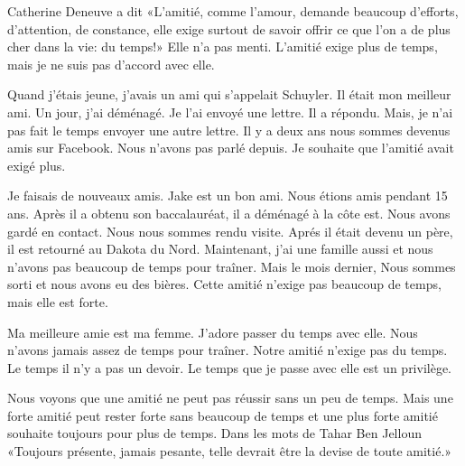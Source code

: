\documentclass[letterpaper]{article}
\begin{document}
\doublespacing
Catherine Deneuve a dit «L'amitié, comme l'amour, demande beaucoup d'efforts, d'attention, de constance, elle exige surtout de savoir offrir ce que l'on a de plus cher dans la vie: du temps!»
Elle n'a pas menti. L'amitié exige plus de temps, mais je ne suis pas d'accord avec elle.

Quand j'étais jeune, j'avais un ami qui s'appelait Schuyler. Il était mon meilleur ami. Un jour, j'ai déménagé. Je l'ai envoyé une lettre. Il a répondu. Mais, je n'ai pas fait le temps envoyer une autre lettre. Il y a deux ans nous sommes devenus amis sur Facebook. Nous n'avons pas parlé depuis. Je souhaite que l'amitié avait exigé plus.

Je faisais de nouveaux amis. Jake est un bon ami. Nous étions amis pendant 15 ans. Après il a obtenu son baccalauréat, il a déménagé à la côte est. Nous avons gardé en contact. Nous nous sommes rendu visite. Aprés il était devenu un père, il est retourné au Dakota du Nord. Maintenant, j'ai une famille aussi et nous n'avons pas beaucoup de temps pour traîner. Mais le mois dernier, Nous sommes sorti et nous avons eu des bières. Cette amitié n'exige pas beaucoup de temps, mais elle est forte.

Ma meilleure amie est ma femme. J'adore passer du temps avec elle. Nous n'avons jamais assez de temps pour traîner. Notre amitié n'exige pas du temps. Le temps il n'y a pas un devoir. Le temps que je passe avec elle est un privilège.

Nous voyons que une amitié ne peut pas réussir sans un peu de temps. Mais une forte amitié peut rester forte sans beaucoup de temps et une plus forte amitié souhaite toujours pour plus de temps. Dans les mots de Tahar Ben Jelloun «Toujours présente, jamais pesante, telle devrait être la devise de toute amitié.»
\end{document}
